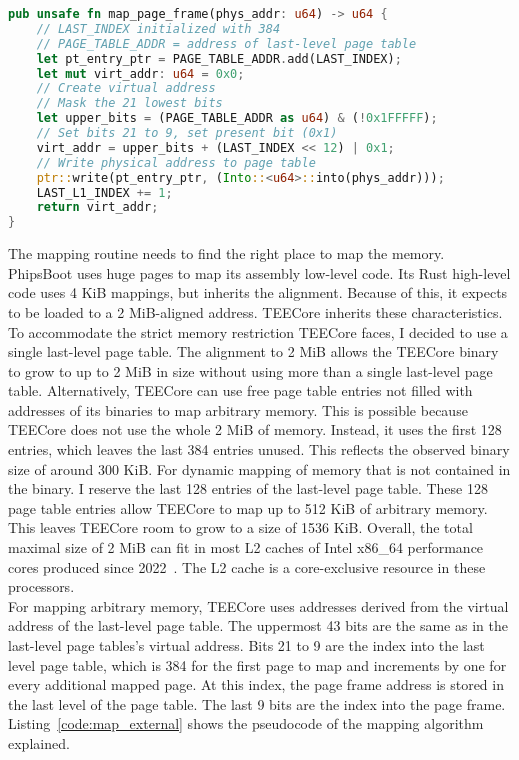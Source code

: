 \begin{lstlisting}[language=Rust, caption=Mapping of external memory, label=code:map_external]
pub unsafe fn map_page_frame(phys_addr: u64) -> u64 {
    // LAST_INDEX initialized with 384
    // PAGE_TABLE_ADDR = address of last-level page table
    let pt_entry_ptr = PAGE_TABLE_ADDR.add(LAST_INDEX);
    let mut virt_addr: u64 = 0x0;
    // Create virtual address
    // Mask the 21 lowest bits
    let upper_bits = (PAGE_TABLE_ADDR as u64) & (!0x1FFFFF);
    // Set bits 21 to 9, set present bit (0x1)
    virt_addr = upper_bits + (LAST_INDEX << 12) | 0x1;
    // Write physical address to page table
    ptr::write(pt_entry_ptr, (Into::<u64>::into(phys_addr)));
    LAST_L1_INDEX += 1;
    return virt_addr;
}
\end{lstlisting}

The mapping routine needs to find the right place to map the memory. PhipsBoot
uses huge pages to map its assembly low-level code. Its Rust high-level code
uses 4 KiB mappings, but inherits the alignment. Because of this, it expects to
be loaded to a 2 MiB-aligned address. TEECore inherits these characteristics. To
accommodate the strict memory restriction TEECore faces, I decided to use a
single last-level page table. The alignment to 2 MiB allows the TEECore binary
to grow to up to 2 MiB in size without using more than a single last-level page
table. Alternatively, TEECore can use free page table entries not filled with
addresses of its binaries to map arbitrary memory. This is possible because
TEECore does not use the whole 2 MiB of memory. Instead, it uses the first 128
entries, which leaves the last 384 entries unused. This reflects the observed
binary size of around 300 KiB. For dynamic mapping of memory that is not
contained in the binary. I reserve the last 128 entries of the last-level page
table. These 128 page table entries allow TEECore to map up to 512 KiB of
arbitrary memory. This leaves TEECore room to grow to a size of 1536 KiB.
Overall, the total maximal size of 2 MiB can fit
in most L2 caches of Intel x86\_64 performance cores produced since
2022~\cite{intel_optimization}. The L2 cache is a core-exclusive resource in
these processors.\\

For mapping arbitrary memory, TEECore uses addresses derived from the virtual
address of the last-level page table. The uppermost 43 bits are the same as in
the last-level page tables's virtual address. Bits 21 to 9 are the index into the last
level page table, which is 384 for the first page to map and increments by one
for every additional mapped page. At this index, the page frame address is
stored in the last level of the page table. The last 9 bits are the index into
the page frame. Listing~\ref{code:map_external} shows the pseudocode of the
mapping algorithm explained.\\

